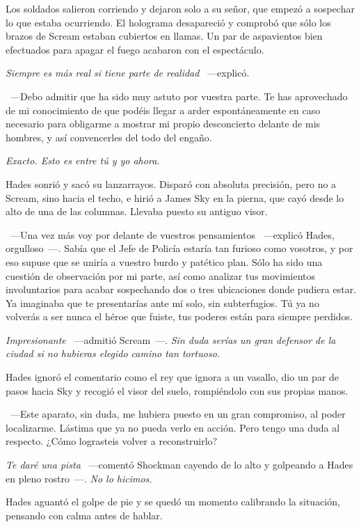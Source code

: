 Los soldados salieron corriendo y dejaron solo a su señor, que empezó a sospechar lo que estaba ocurriendo. El holograma desapareció y comprobó que sólo los brazos de Scream estaban cubiertos en llamas. Un par de aspavientos bien efectuados para apagar el fuego acabaron con el espectáculo.

\emph{Siempre es más real si tiene parte de realidad} ~---explicó.

~---Debo admitir que ha sido muy astuto por vuestra parte. Te has aprovechado de mi conocimiento de que podéis llegar a arder espontáneamente en caso necesario para obligarme a mostrar mi propio desconcierto delante de mis hombres, y así convencerles del todo del engaño.

\emph{Exacto. Esto es entre tú y yo ahora.}

Hades sonrió y sacó su lanzarrayos. Disparó con absoluta precisión, pero no a Scream, sino hacia el techo, e hirió a James Sky en la pierna, que cayó desde lo alto de una de las columnas. Llevaba puesto su antiguo visor.

~---Una vez más voy por delante de vuestros pensamientos ~---explicó Hades, orgulloso~---. Sabía que el Jefe de Policía estaría tan furioso como vosotros, y por eso supuse que se uniría a vuestro burdo y patético plan. Sólo ha sido una cuestión de observación por mi parte, así como analizar tus movimientos involuntarios para acabar sospechando dos o tres ubicaciones donde pudiera estar. Ya imaginaba que te presentarías ante mí solo, sin subterfugios. Tú ya no volverás a ser nunca el héroe que fuiste, tus poderes están para siempre perdidos.

\emph{Impresionante} ~---admitió Scream~---. \emph{Sin duda serías un gran defensor de la ciudad si no hubieras elegido camino tan tortuoso.}

Hades ignoró el comentario como el rey que ignora a un vasallo, dio un par de pasos hacia Sky y recogió el visor del suelo, rompiéndolo con sus propias manos.

~---Este aparato, sin duda, me hubiera puesto en un gran compromiso, al poder localizarme. Lástima que ya no pueda verlo en acción. Pero tengo una duda al respecto. ¿Cómo lograsteis volver a reconstruirlo?

\emph{Te daré una pista} ~---comentó Shockman cayendo de lo alto y golpeando a Hades en pleno rostro~---. \emph{No lo hicimos.}

Hades aguantó el golpe de pie y se quedó un momento calibrando la situación, pensando con calma antes de hablar.

